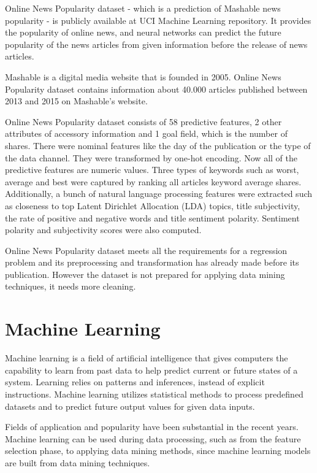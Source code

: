 Online News Popularity dataset \cite{Fernandes2015API} - which is a prediction of Mashable news popularity - is publicly available at UCI Machine Learning repository. It provides the popularity of online news, and neural networks can predict the future popularity of the news articles from given information before the release of news articles. \smallskip

Mashable is a digital media website that is founded in 2005. Online News Popularity dataset \cite{Ren2015PredictingAE} contains information about 40.000 articles published between 2013 and 2015 on Mashable's website. \smallskip

Online News Popularity dataset consists of 58 predictive features, 2 other attributes of accessory information and 1 goal field, which is the number of shares. There were nominal features like the day of the publication or the type of the data channel. They were transformed by one-hot encoding. Now all of the predictive features are numeric values. Three types of keywords such as worst, average and best were captured by ranking all articles keyword average shares. Additionally, a bunch of natural language processing features were extracted such as closeness to top Latent Dirichlet Allocation (LDA) topics, title subjectivity, the rate of positive and negative words and title sentiment polarity. Sentiment polarity and subjectivity scores were also computed.\smallskip

Online News Popularity dataset meets all the requirements for a regression problem and its preprocessing and transformation has already made before its publication. However the dataset is not prepared for applying data mining techniques, it needs more cleaning.



\section{Machine Learning}

Machine learning \cite{mitchell1997machine, michalski2014machine, alpaydin2009introduction} is a field of artificial intelligence that gives computers the capability to learn from past data to help predict current or future states of a system. Learning relies on patterns and inferences, instead of explicit instructions. Machine learning utilizes statistical methods to process predefined datasets and to predict future output values for given data inputs. \medskip

Fields of application and popularity have been substantial in the recent years. Machine learning can be used during data processing, such as from the feature selection phase, to applying data mining methods, since machine learning models are built from data mining techniques.  \medskip

